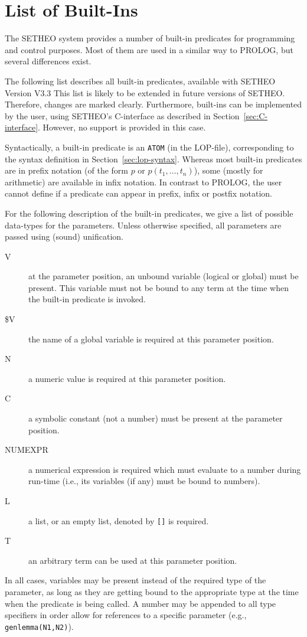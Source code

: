 \section{List of Built-Ins}

The SETHEO system provides a number of built-in predicates
for programming and control purposes.
Most of them are used in a similar way to PROLOG, but several
differences exist.

The following list describes all built-in predicates, available
with SETHEO Version V3.3
This list is likely to be extended in future versions of SETHEO.
Therefore, changes are marked clearly.
Furthermore, built-ins can be implemented by the user, using
SETHEO's C-interface as described in Section~\ref{sec:C-interface}.
However, no support is provided in this case.

Syntactically, a built-in predicate is an {\tt ATOM} 
(in the LOP-file), corresponding to the syntax definition in
Section~\ref{sec:lop-syntax}.
Whereas most built-in predicates are in prefix notation
(of the form $p$ or $p(t_1,\ldots,t_n)$), some (mostly for
arithmetic) are available in infix notation.
In contrast to PROLOG, the user cannot define if a predicate can
appear in prefix, infix or postfix notation.

For the following description of the built-in predicates, we give
a list of possible data-types for the parameters. Unless otherwise
specified, all parameters are passed using (sound) unification.

\begin{description}
\item[V] at the parameter position, an unbound variable (logical or
	global) must be present. This variable must not be bound to any term
	at the time when the built-in predicate is invoked. 
\item[\$V] the name of a global variable is required at this
	parameter position.
\item[N] a numeric value is required at this parameter position.
\item[C] a symbolic constant (not a number) must be present at the
	parameter position.
\item[NUMEXPR] a numerical expression is required which must evaluate to a
	number during run-time (i.e., its variables (if any) must be
	bound to numbers).
\item[L] a list, or an empty list, denoted by {\tt []} is
	required.
\item[T] an arbitrary term can be used at this parameter position.
\end{description}

In all cases, variables may be present instead of the required type of
the parameter, as long as they are getting bound to the appropriate
type at the time when the predicate is being called.
A number may be appended to all type specifiers in order allow for
references to a specific parameter (e.g., {\tt genlemma(N1,N2)}).
